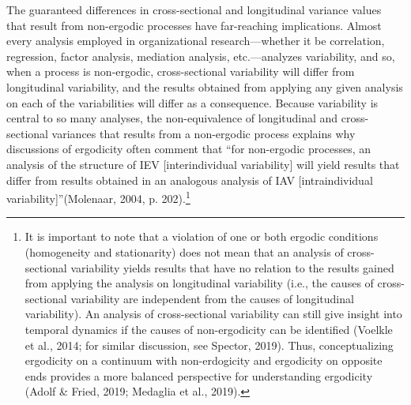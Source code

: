 \documentclass[
12pt, %
twoside,
english]{guelphthesis}
\theoremstyle{definition}
\theoremstyle{definition}
\theoremstyle{definition}
\theoremstyle{definition}
\theoremstyle{remark}
\begin{document}
The guaranteed differences in cross-sectional and longitudinal variance values that result from non-ergodic processes have far-reaching implications. Almost every analysis employed in organizational research---whether it be correlation, regression, factor analysis, mediation analysis, etc.---analyzes variability, and so, when a process is non-ergodic, cross-sectional variability will differ from longitudinal variability, and the results obtained from applying any given analysis on each of the variabilities will differ as a consequence. Because variability is central to so many analyses, the non-equivalence of longitudinal and cross-sectional variances that results from a non-ergodic process explains why discussions of ergodicity often comment that ``for non-ergodic processes, an analysis of the structure of IEV {[}interindividual variability{]} will yield results that differ from results obtained in an analogous analysis of IAV {[}intraindividual variability{]}''(Molenaar, 2004, p. 202).\footnote{It is important to note that a violation of one or both ergodic conditions (homogeneity and stationarity) does not mean that an analysis of cross-sectional variability yields results that have no relation to the results gained from applying the analysis on longitudinal variability (i.e., the causes of cross-sectional variability are independent from the causes of longitudinal variability). An analysis of cross-sectional variability can still give insight into temporal dynamics if the causes of non-ergodicity can be identified (Voelkle et al., 2014; for similar discussion, see Spector, 2019). Thus, conceptualizing ergodicity on a continuum with non-erdogicity and ergodicity on opposite ends provides a more balanced perspective for understanding ergodicity (Adolf \& Fried, 2019; Medaglia et al., 2019).}
\end{document}
